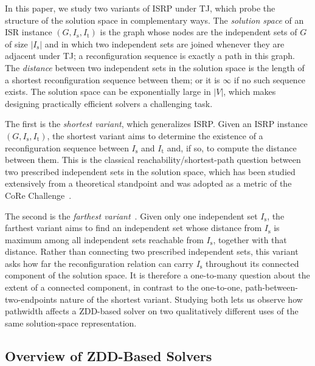 \documentclass[conference]{IEEEtran}
\newcommand{\ini}{\mathrm{s}}
\newcommand{\tar}{\mathrm{t}}
\begin{document}
In this paper, we study two variants of ISRP under TJ, which probe the structure
of the solution space in complementary ways.
The \emph{solution space} of an ISR instance $(G, I_\ini, I_\tar)$ is the graph whose nodes are the
independent sets of $G$ of size $|I_\ini|$ and in which two independent sets are
joined whenever they are adjacent under TJ; a reconfiguration sequence is exactly
a path in this graph. The \emph{distance} between two independent sets in the
solution space is the length of a shortest reconfiguration sequence between them;
or it is $\infty$ if no such sequence exists. The solution space can be exponentially
large in $|V|$, which makes designing practically efficient solvers a challenging
task.

The first is the \emph{shortest variant}, which generalizes ISRP.
Given an ISRP instance $(G, I_\ini, I_\tar)$, the shortest variant aims to
determine the existence of a reconfiguration sequence between $I_\ini$ and
$I_\tar$ and, if so, to compute the distance between them. This is the classical
reachability/shortest-path question between two prescribed independent sets in the solution space,
which has been studied extensively from a theoretical standpoint and was adopted
as a metric of the CoRe Challenge~\cite{sotaokit24}.

The second is the \emph{farthest variant}~\cite{ItoKNSSTT23}.
Given only one independent set $I_\ini$, the farthest variant aims to find an
independent set whose distance from $I_\ini$ is maximum among all independent
sets reachable from $I_\ini$, together with that distance. Rather than connecting
two prescribed independent sets, this variant asks how far the reconfiguration
relation can carry $I_\ini$ throughout its connected component of the solution
space. It is therefore a one-to-many question about the extent of a connected
component, in contrast to the one-to-one, path-between-two-endpoints nature of
the shortest variant. Studying both lets us observe how pathwidth affects a
ZDD-based solver on two qualitatively different uses of the same solution-space
representation.

\subsection{Overview of ZDD-Based Solvers}
\label{subsec:zdd_solver}

\end{document}

